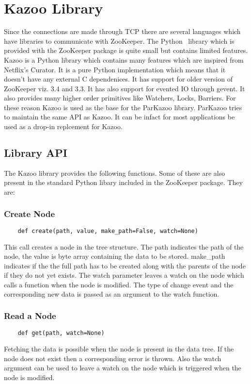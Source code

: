 \section{Kazoo Library}
Since the connections are made through TCP there are several languages which have libraries to communicate with ZooKeeper. The Python~\cite{van2002python} library which is provided with the ZooKeeper package is quite small but contains limited features. Kazoo is a Python library which contains many features which are inspired from Netflix's Curator. It is a pure Python implementation which means that it doesn't have any external C dependenices. It has support for older version of ZooKeeper viz. 3.4 and 3.3. It has also support for evented IO through gevent. It also provides many higher order primitives like Watchers, Locks, Barriers. For these reason Kazoo is used as the base for the ParKazoo library. ParKazoo tries to maintain the same API as Kazoo. It can be infact for most applications be used as a drop-in replcement for Kazoo.

\subsection{Library API}
The Kazoo library provides the following functions. Some of these are also present in the standard Python libary included in the ZooKeeper package. They are:
  \subsubsection{Create Node}
  \begin{lstlisting}
    def create(path, value, make_path=False, watch=None)
  \end{lstlisting}
  This call creates a node in the tree structure. The path indicates the path of the node, the value is byte array containing the data to be stored. make\_path indicates if the the full path has to be created along with the parents of the node if they do not yet exists. The watch parameter leaves a watch on the node which calls a function when the node is modified. The type of change event and the corresponding new data is passed as an argument to the watch function.
  \subsubsection{Read a Node}
  \begin{lstlisting}
    def get(path, watch=None)
  \end{lstlisting}
  Fetching the data is possible when the node is present in the data tree. If the node does not exist then a corresponding error is thrown. Also the watch argument can be used to leave a watch on the node which is triggered when the node is modified.
